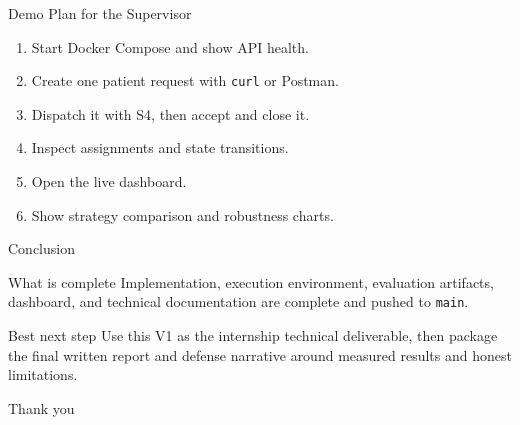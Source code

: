 \documentclass[aspectratio=169,11pt]{beamer}
\begin{document}
\begin{frame}{Demo Plan for the Supervisor}
  \begin{enumerate}
    \item Start Docker Compose and show API health.
    \item Create one patient request with \texttt{curl} or Postman.
    \item Dispatch it with S4, then accept and close it.
    \item Inspect assignments and state transitions.
    \item Open the live dashboard.
    \item Show strategy comparison and robustness charts.
  \end{enumerate}
\end{frame}

\begin{frame}{Conclusion}
  \begin{block}{What is complete}
    Implementation, execution environment, evaluation artifacts, dashboard, and technical documentation are complete and pushed to \texttt{main}.
  \end{block}

  \begin{block}{Best next step}
    Use this V1 as the internship technical deliverable, then package the final written report and defense narrative around measured results and honest limitations.
  \end{block}

  \begin{center}
    \Large Thank you
  \end{center}
\end{frame}
\end{document}
